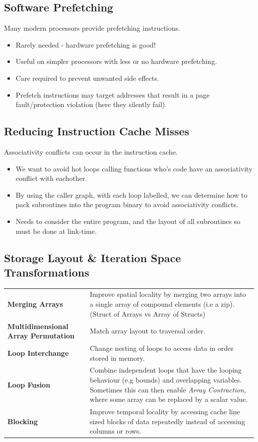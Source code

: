\subsection{Software Prefetching}
Many modern processors provide prefetching instructions.
\begin{itemize}
    \item Rarely needed - hardware prefetching is good!
    \item Useful on simpler processors with less or no hardware prefetching.
    \item Care required to prevent unwanted side effects.
    \item Prefetch instructions may target addresses that result in a page fault/protection violation (here they silently fail).
\end{itemize}

\subsection{Reducing Instruction Cache Misses}
Associativity conflicts can occur in the instruction cache.
\begin{itemize}
    \item We want to avoid hot loops calling functions who's code have an associativity conflict with eachother.
    \item By using the caller graph, with each loop labelled, we can determine how to pack subroutines into the program binary to avoid associativity conflicts.
    \item Needs to consider the entire program, and the layout of all subroutines so must be done at link-time.
\end{itemize}


\subsection{Storage Layout \& Iteration Space Transformations}
\begin{center}
    \begin{tabular}{l p{}}
        \textbf{Merging Arrays} & Improve spatial locality by merging two arrays into a single array of compound elements (i.e a zip). (Struct of Arrays vs Array of Structs) \\
        \textbf{Multidimensional Array Permutation} & Match array layout to traversal order. \\
        \textbf{Loop Interchange} & Change nesting of loops to access data in order stored in memory. \\
        \textbf{Loop Fusion} & Combine independent loops that have the looping behaviour (e.g bounds) and overlapping variables. Sometimes this can then enable \textit{Array Contraction}, where some array can be replaced by a scalar value. \\
        \textbf{Blocking} & Improve temporal locality by accessing cache line sized blocks of data repeatedly instead of accessing columns or rows. \\
    \end{tabular}
\end{center}

